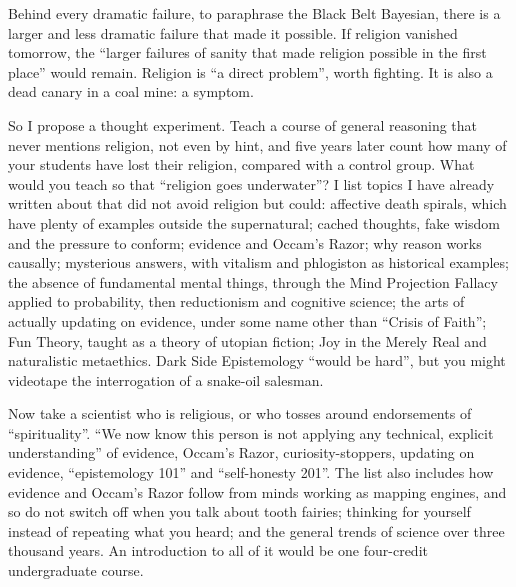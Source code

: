 
Behind every dramatic failure, to paraphrase the Black Belt Bayesian, there is a larger and less dramatic failure that made it possible. If religion vanished tomorrow, the ``larger failures of sanity that made religion possible in the first place'' would remain. Religion is ``a direct problem'', worth fighting. It is also a dead canary in a coal mine: a symptom.

So I propose a thought experiment. Teach a course of general reasoning that never mentions religion, not even by hint, and five years later count how many of your students have lost their religion, compared with a control group. What would you teach so that ``religion goes underwater''?  I list topics I have already written about that did not avoid religion but could: affective death spirals, which have plenty of examples outside the supernatural; cached thoughts, fake wisdom and the pressure to conform; evidence and Occam's Razor; why reason works causally; mysterious answers, with vitalism and phlogiston as historical examples; the absence of fundamental mental things, through the Mind Projection Fallacy applied to probability, then reductionism and cognitive science; the arts of actually updating on evidence, under some name other than ``Crisis of Faith''; Fun Theory, taught as a theory of utopian fiction; Joy in the Merely Real and naturalistic metaethics. Dark Side Epistemology ``would be hard'', but you might videotape the interrogation of a snake-oil salesman.

Now take a scientist who is religious, or who tosses around endorsements of ``spirituality''. ``We now know this person is not applying any technical, explicit understanding'' of evidence, Occam's Razor, curiosity-stoppers, updating on evidence, ``epistemology 101'' and ``self-honesty 201''. The list also includes how evidence and Occam's Razor follow from minds working as mapping engines, and so do not switch off when you talk about tooth fairies; thinking for yourself instead of repeating what you heard; and the general trends of science over three thousand years.  An introduction to all of it would be one four-credit undergraduate course.

